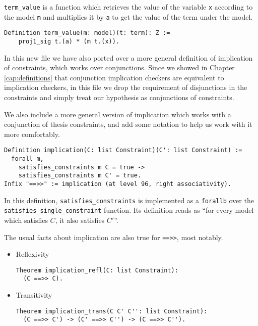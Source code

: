 \texttt{term_value} is a function which retrieves the value of the variable 
\texttt{x} according to the model \texttt{m} and multiplies it by 
\texttt{a} to get the value of the term under the model.

\begin{verbatim}
Definition term_value(m: model)(t: term): Z := 
    proj1_sig t.(a) * (m t.(x)).
\end{verbatim}



In this new file we have also ported over a more general definition of implication of
constraints, which works over conjunctions. Since we showed in Chapter \ref{cap:definitions}
that conjunction implication checkers are equivalent to implication checkers, in this
file we drop the requirement of disjunctions in the constraints and simply treat our
hypothesis as conjunctions of constraints.

We also include a more general version of implication which works with a conjunction
of thesis constraints, and add some notation to help us work with it more comfortably.

\begin{verbatim}
Definition implication(C: list Constraint)(C': list Constraint) :=
  forall m, 
    satisfies_constraints m C = true ->
    satisfies_constraints m C' = true.
Infix "==>>" := implication (at level 96, right associativity).
\end{verbatim}

In this definition, \texttt{satisfies_constraints} is implemented as a 
\texttt{forallb} over the \texttt{satisfies_single_constraint} 
function. Its definition reads as ``for every model which satisfies $C$, it also
satisfies $C'$''.

The usual facts about implication are also true for \texttt{==>>}, most notably.

\begin{itemize}
    \item Reflexivity
\begin{verbatim}
Theorem implication_refl(C: list Constraint):
  (C ==>> C).
\end{verbatim}

    \item Transitivity
\begin{verbatim}
Theorem implication_trans(C C' C'': list Constraint):
  (C ==>> C') -> (C' ==>> C'') -> (C ==>> C'').
\end{verbatim}
  
\end{itemize}

